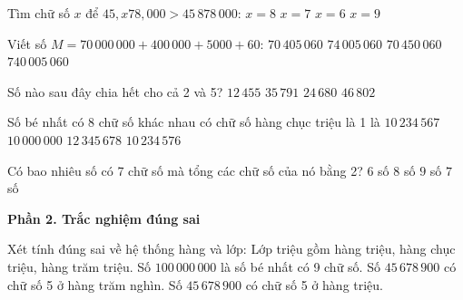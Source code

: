 \begin{ex} %
Tìm chữ số $x$ để $45,x78,000 > 45\,878\,000$:
\choice
{$x = 8$}
{$x = 7$}
{$x = 6$}
{\True $x = 9$}
\end{ex}

\begin{ex} %
Viết số $M = 70\,000\,000 + 400\,000 + 5000 + 60$:
\choice
{\True $70\,405\,060$}
{$74\,005\,060$}
{$70\,450\,060$}
{$740\,005\,060$}
\end{ex}

\begin{ex} %
Số nào sau đây chia hết cho cả 2 và 5?
\choice
{$12\,455$}
{$35\,791$}
{\True $24\,680$}
{$46\,802$}
\end{ex}

\begin{ex} %
Số bé nhất có 8 chữ số khác nhau có chữ số hàng chục triệu là 1 là
\choice
{\True $10\,234\,567$}
{$10\,000\,000$}
{$12\,345\,678$}
{$10\,234\,576$}
\end{ex}

\begin{ex} %
Có bao nhiêu số có 7 chữ số mà tổng các chữ số của nó bằng 2?
\choice
{$6$ số}
{$8$ số}
{$9$ số}
{\True $7$ số}
\end{ex}

\textbf{Phần 2. Trắc nghiệm đúng sai}

\begin{ex} %
Xét tính đúng sai về hệ thống hàng và lớp:
\choiceTF
{\True Lớp triệu gồm hàng triệu, hàng chục triệu, hàng trăm triệu.}
{\True Số $100\,000\,000$ là số bé nhất có 9 chữ số.}
{Số $45\,678\,900$ có chữ số 5 ở hàng trăm nghìn.}
{\True Số $45\,678\,900$ có chữ số 5 ở hàng triệu.}
\end{ex}

